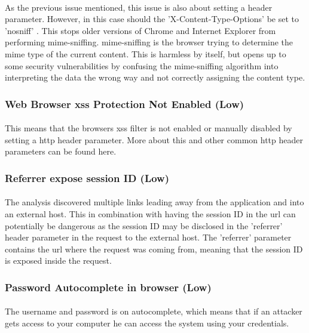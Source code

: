 \documentclass[11pt,english,a4paper]{report}
\begin{document}
\paragraph{}
As the previous issue mentioned, this issue is also about setting a header parameter.
However, in this case should the 'X-Content-Type-Options' be set to 'nosniff' \cite{no-sniff}. 
This stops older versions of Chrome and Internet Explorer from performing \gls{mime}-sniffing. 
\gls{mime}-sniffing is the browser trying to determine the \gls{mime} type of the current content. 
This is harmless by itself, but opens up to some security vulnerabilities by confusing the \gls{mime}-sniffing algorithm into interpreting the data the wrong way and not correctly assigning the content type.


\subsubsection{Web Browser \gls{xss} Protection Not Enabled (Low)}
\paragraph{}
This means that the browsers \gls{xss} filter is not enabled or manually disabled by setting a \gls{http} header parameter.
More about this and other common \gls{http} header parameters can be found here\cite{important-headers}. 

\subsubsection{Referrer expose session ID (Low)}
\paragraph{}
The analysis discovered multiple links leading away from the application and into an external host.
This in combination with having the session ID in the \gls{url} can potentially be dangerous as the session ID may be disclosed in the 'referrer' header parameter in the request to the external host.
The 'referrer' parameter contains the \gls{url} where the request was coming from, meaning that the session ID is exposed inside the request.

\subsubsection{Password Autocomplete in browser (Low)}
\paragraph{}
The username and password is on autocomplete, which means that if an attacker gets access to your computer he can access the system using your credentials.
\end{document}

